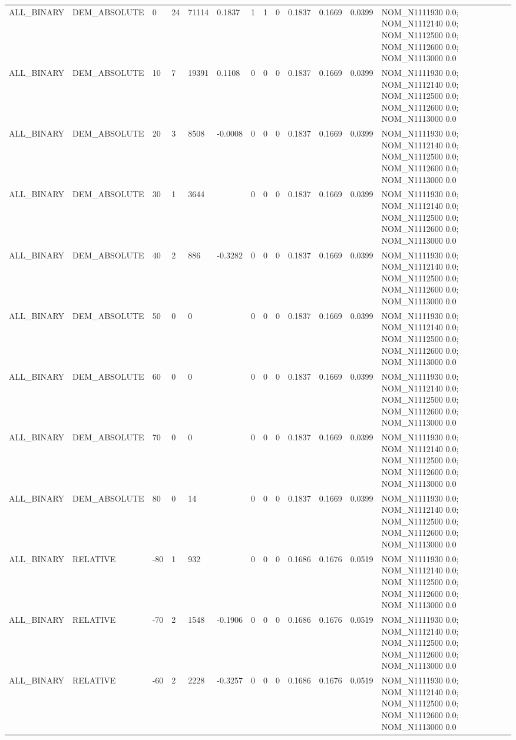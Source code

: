 \begin{table}[ht]
\begin{tabular}{lllllllllllll}
ALL\_BINARY & DEM\_ABSOLUTE & 0 & 24 & 71114 & 0.1837 & 1 & 1 & 0 & 0.1837 & 0.1669 & 0.0399 & NOM\_N1111930 0.0; NOM\_N1112140 0.0; NOM\_N1112500 0.0; NOM\_N1112600 0.0; NOM\_N1113000 0.0 \\
ALL\_BINARY & DEM\_ABSOLUTE & 10 & 7 & 19391 & 0.1108 & 0 & 0 & 0 & 0.1837 & 0.1669 & 0.0399 & NOM\_N1111930 0.0; NOM\_N1112140 0.0; NOM\_N1112500 0.0; NOM\_N1112600 0.0; NOM\_N1113000 0.0 \\
ALL\_BINARY & DEM\_ABSOLUTE & 20 & 3 & 8508 & -0.0008 & 0 & 0 & 0 & 0.1837 & 0.1669 & 0.0399 & NOM\_N1111930 0.0; NOM\_N1112140 0.0; NOM\_N1112500 0.0; NOM\_N1112600 0.0; NOM\_N1113000 0.0 \\
ALL\_BINARY & DEM\_ABSOLUTE & 30 & 1 & 3644 &  & 0 & 0 & 0 & 0.1837 & 0.1669 & 0.0399 & NOM\_N1111930 0.0; NOM\_N1112140 0.0; NOM\_N1112500 0.0; NOM\_N1112600 0.0; NOM\_N1113000 0.0 \\
ALL\_BINARY & DEM\_ABSOLUTE & 40 & 2 & 886 & -0.3282 & 0 & 0 & 0 & 0.1837 & 0.1669 & 0.0399 & NOM\_N1111930 0.0; NOM\_N1112140 0.0; NOM\_N1112500 0.0; NOM\_N1112600 0.0; NOM\_N1113000 0.0 \\
ALL\_BINARY & DEM\_ABSOLUTE & 50 & 0 & 0 &  & 0 & 0 & 0 & 0.1837 & 0.1669 & 0.0399 & NOM\_N1111930 0.0; NOM\_N1112140 0.0; NOM\_N1112500 0.0; NOM\_N1112600 0.0; NOM\_N1113000 0.0 \\
ALL\_BINARY & DEM\_ABSOLUTE & 60 & 0 & 0 &  & 0 & 0 & 0 & 0.1837 & 0.1669 & 0.0399 & NOM\_N1111930 0.0; NOM\_N1112140 0.0; NOM\_N1112500 0.0; NOM\_N1112600 0.0; NOM\_N1113000 0.0 \\
ALL\_BINARY & DEM\_ABSOLUTE & 70 & 0 & 0 &  & 0 & 0 & 0 & 0.1837 & 0.1669 & 0.0399 & NOM\_N1111930 0.0; NOM\_N1112140 0.0; NOM\_N1112500 0.0; NOM\_N1112600 0.0; NOM\_N1113000 0.0 \\
ALL\_BINARY & DEM\_ABSOLUTE & 80 & 0 & 14 &  & 0 & 0 & 0 & 0.1837 & 0.1669 & 0.0399 & NOM\_N1111930 0.0; NOM\_N1112140 0.0; NOM\_N1112500 0.0; NOM\_N1112600 0.0; NOM\_N1113000 0.0 \\
ALL\_BINARY & RELATIVE & -80 & 1 & 932 &  & 0 & 0 & 0 & 0.1686 & 0.1676 & 0.0519 & NOM\_N1111930 0.0; NOM\_N1112140 0.0; NOM\_N1112500 0.0; NOM\_N1112600 0.0; NOM\_N1113000 0.0 \\
ALL\_BINARY & RELATIVE & -70 & 2 & 1548 & -0.1906 & 0 & 0 & 0 & 0.1686 & 0.1676 & 0.0519 & NOM\_N1111930 0.0; NOM\_N1112140 0.0; NOM\_N1112500 0.0; NOM\_N1112600 0.0; NOM\_N1113000 0.0 \\
ALL\_BINARY & RELATIVE & -60 & 2 & 2228 & -0.3257 & 0 & 0 & 0 & 0.1686 & 0.1676 & 0.0519 & NOM\_N1111930 0.0; NOM\_N1112140 0.0; NOM\_N1112500 0.0; NOM\_N1112600 0.0; NOM\_N1113000 0.0 \\

\end{tabular}
\end{table}
